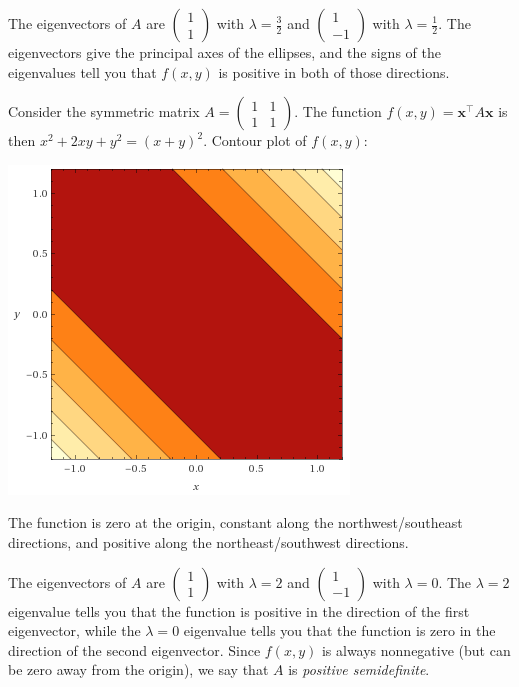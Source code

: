 \documentclass[10pt]{amsart}
\theoremstyle{mythm}
\theoremstyle{definition}
\theoremstyle{myrmk}
\begin{document}
	The eigenvectors of $A$ are $\begin{pmatrix}
	1 \\ 1
	\end{pmatrix}$ with $\lambda = \frac32$ and $\begin{pmatrix}
	1 \\ -1
	\end{pmatrix}$ with $\lambda = \frac12$. The eigenvectors give the principal axes of the ellipses, and the signs of the eigenvalues tell you that $f(x, y)$ is positive in both of those directions. 
	
	Consider the symmetric matrix $A = \begin{pmatrix}
	1 & 1 \\
	1 & 1
	\end{pmatrix}$. The function $f(x, y) = \bm{x}^\top A \bm{x}$ is then $x^2 + 2xy + y^2 = (x+y)^2$. Contour plot of $f(x, y)$: 
	\begin{center}
		\includegraphics{rec10-pic3}
	\end{center}
	The function is zero at the origin, constant along the northwest/southeast directions, and positive along the northeast/southwest directions. 
	
	The eigenvectors of $A$ are $\begin{pmatrix}
	1 \\ 1
	\end{pmatrix}$ with $\lambda = 2$ and $\begin{pmatrix}
	1 \\ -1
	\end{pmatrix}$ with $\lambda = 0$. The $\lambda = 2$ eigenvalue tells you that the function is positive in the direction of the first eigenvector, while the $\lambda = 0$ eigenvalue tells you that the function is zero in the direction of the second eigenvector. Since $f(x, y)$ is always nonnegative (but can be zero away from the origin), we say that $A$ is \emph{positive semidefinite}. 
	
\end{document}
